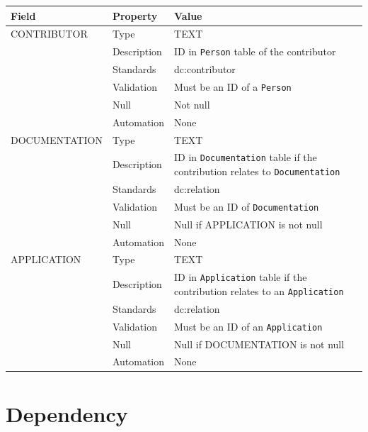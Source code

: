 \documentclass[
]{article}
\newcounter{none} %
\begin{document}
{\def\LTcaptype{none} %
\begin{longtable}[]{@{}
  >{\raggedright\arraybackslash}p{}
  >{\raggedright\arraybackslash}p{}
  >{\raggedright\arraybackslash}p{}@{}}
\toprule\noalign{}
\begin{minipage}[b]{\linewidth}\raggedright
Field
\end{minipage} & \begin{minipage}[b]{\linewidth}\raggedright
Property
\end{minipage} & \begin{minipage}[b]{\linewidth}\raggedright
Value
\end{minipage} \\
\midrule\noalign{}
\endhead
\bottomrule\noalign{}
\endlastfoot
CONTRIBUTOR & Type & TEXT \\
& Description & ID in \texttt{Person} table of the contributor \\
& Standards & dc:contributor \\
& Validation & Must be an ID of a \texttt{Person} \\
& Null & Not null \\
& Automation & None \\
DOCUMENTATION & Type & TEXT \\
& Description & ID in \texttt{Documentation} table if the contribution
relates to \texttt{Documentation} \\
& Standards & dc:relation \\
& Validation & Must be an ID of \texttt{Documentation} \\
& Null & Null if APPLICATION is not null \\
& Automation & None \\
APPLICATION & Type & TEXT \\
& Description & ID in \texttt{Application} table if the contribution
relates to an \texttt{Application} \\
& Standards & dc:relation \\
& Validation & Must be an ID of an \texttt{Application} \\
& Null & Null if DOCUMENTATION is not null \\
& Automation & None \\
\end{longtable}
}

\section{Dependency}\label{dependency}
\end{document}
